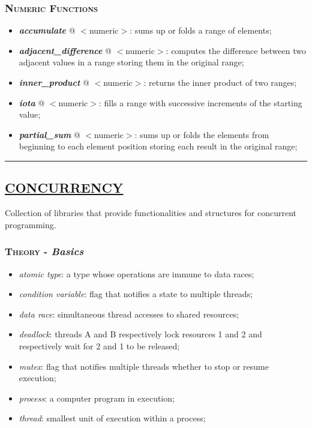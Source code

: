 \documentclass[10pt]{article}
\begin{document}
\begin{multicols*}{5}
{\subsubsection*{\textsc{Numeric Functions}} 
\begin{itemize}[leftmargin=*,topsep=0.25pt]
  \setlength\itemsep{-1.8pt}
	\item  \emph{\textbf{accumulate}} @ $<$numeric$>$: sums up or folds a range of elements;
	\item  \emph{\textbf{adjacent\_difference}} @ $<$numeric$>$: computes the difference between two adjacent values in a range storing them in the original range;
	\item  \emph{\textbf{inner\_product}} @ $<$numeric$>$: returns the inner product of two ranges;
	\item  \emph{\textbf{iota}} @ $<$numeric$>$: fills a range with successive increments of the starting value;
	\item  \emph{\textbf{partial\_sum}} @ $<$numeric$>$: sums up or folds the elements from beginning to each element position storing each result in the original range;
\end{itemize}
}

\par\noindent\rule{155pt}{0.4pt}

{\color{Blue}
\subsection*{\href{https://en.cppreference.com/w/cpp/thread}{\underline{CONCURRENCY}}}	
\noindent
Collection of libraries that provide functionalities and structures for concurrent programming.

\subsubsection*{\textsc{Theory} - \emph{Basics}} 
\begin{itemize}[leftmargin=*,topsep=0.25pt]
  \setlength\itemsep{-1.8pt}
	\item  \emph{atomic type}: a type whose operations are immune to data races;
	\item  \emph{condition variable}: flag that notifies a state to multiple threads;  
	\item  \emph{data race}: simultaneous thread accesses to shared resources;
	\item  \emph{deadlock}: threads A and B respectively lock resources 1 and 2 and respectively wait for 2 and 1 to be released;
	\item  \emph{mutex}: flag that notifies multiple threads whether to stop or resume execution; 
	\item  \emph{process}: a computer program in execution;
	\item  \emph{thread}: smallest unit of execution within a process;
\end{itemize}

}
\end{multicols*}
\end{document}
